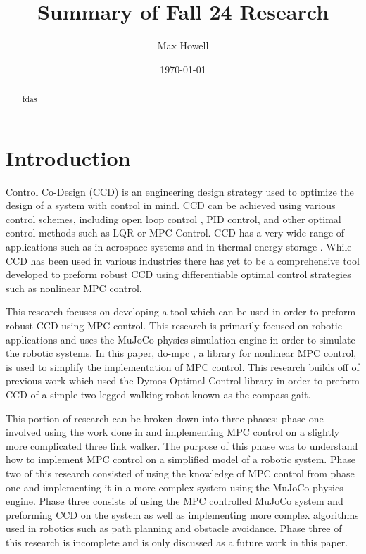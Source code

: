 \documentclass{./springer/svjour3}
\title{Summary of Fall 24 Research}
\author{Max Howell}
\institute{University Of Tennessee Knoxville$^*$ ($^*$corresponding author),
          \email{mhowel30@vols.utk.edu} \\
        \\
          \at MABE, University of Tennessee, Knoxville,
          \at Nathan W. Dougherty Engineering Building, 1512 Middle Dr, Knoxville, TN 37916\\
}
\date{\today}
\begin{document}
\maketitle{}

\begin{abstract}

fdas

\end{abstract}

\section{Introduction}

Control Co-Design (CCD) is an engineering design strategy used to optimize the design of a system with control in mind. CCD can be achieved using various control schemes, 
including open loop control \cite{Sundarrajan2023}, PID control, and other optimal control methods such as LQR or MPC Control. CCD has a very wide range of applications such as in 
aerospace systems \cite{Van2019} and in thermal energy storage \cite{10177617}. While CCD has been used in various industries there has yet to be a comprehensive tool developed
to preform robust CCD using differentiable optimal control strategies such as nonlinear MPC control.

This research focuses on developing a tool which can be used in order to preform robust CCD using MPC control. This research is primarily focused on robotic applications and uses 
the MuJoCo \cite{todorov2012mujoco} physics simulation engine in order to simulate the robotic systems. In this paper, do-mpc \cite{FIEDLER2023105676}, a library for nonlinear MPC control, is used to simplify the 
implementation of MPC control. This research builds off of previous work \cite{Howell2024} which used the Dymos Optimal Control library \cite{Falck2021} in order to preform CCD of a simple 
two legged walking robot known as the compass gait. 

This portion of research can be broken down into three phases; phase one involved using the work done in \cite{Howell2024} and implementing MPC control on a slightly 
more complicated three link walker. The purpose of this phase was to understand how to implement MPC control on a simplified model of a robotic system.
Phase two of this research consisted of using the knowledge of MPC control from phase one and implementing it in a more complex system using the MuJoCo physics engine.
Phase three consists of using the MPC controlled MuJoCo system and preforming CCD on the system as well as implementing more complex algorithms used in robotics such as 
path planning and obstacle avoidance. Phase three of this research is incomplete and is only discussed as a future work in this paper.
\end{document}
